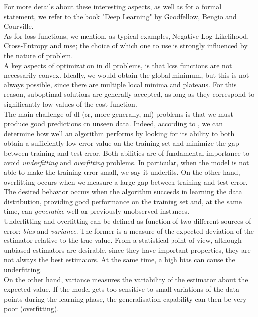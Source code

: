 For more details about these interesting aspects, as well as for a formal statement, we refer to the book "Deep Learning" \cite{goodfellow2016deep} by Goodfellow, Bengio and Courville. \\
As for loss functions, we mention, as typical examples, Negative Log-Likelihood, Cross-Entropy and \gls{mse}; the choice of which one to use is strongly influenced by the nature of problem. \\
A key aspects of optimization in \gls{dl} problems, is that loss functions are not necessarily convex. Ideally, we would obtain the global minimum, but this is not always possible, since there are multiple local minima and plateaus. For this reason, suboptimal solutions are generally accepted, as long as they correspond to significantly low values of the cost function.
\\
The main challenge of \gls{dl} (or, more generally, \gls{ml}) problems is that we must produce good predictions on unseen data. Indeed, according to \cite{goodfellow2016deep}, we can determine how well an algorithm performs by looking for its ability to both obtain a sufficiently low error value on the training set and minimize the gap between training and test error. Both abilities are of fundamental importance to avoid \textit{underfitting} and \textit{overfitting} problems. In particular, when the model is not able to make the training error small, we say it underfits. On the other hand, overfitting occurs when we measure a large gap between training and test error. The desired behavior occurs when the algorithm succeeds in learning the data distribution, providing good performance on the training set and, at the same time, can \textit{generalize} well on previously unobserved instances. \\
Underfitting and overfitting can be defined as function of two different sources of error: \textit{bias} and \textit{variance}. The former is a measure of the expected deviation of the estimator relative to the true value. From a statistical point of view, although unbiased estimators are desirable, since they have important properties, they are not always the best estimators. At the same time, a high bias can cause the underfitting. \\
On the other hand, variance measures the variability of the estimator about the expected value. If the model gets too sensitive to small variations of the data points during the learning phase, the generalisation capability can then be very poor (overfitting). \\
